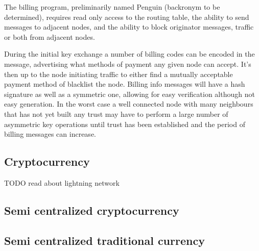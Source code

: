 \documentclass[11pt]{article}
\begin{document}
    The billing program, preliminarily named Penguin (backronym to be determined), requires read only access to the routing table, the ability to send messages to adjacent nodes, and the ability to block originator messages, traffic or both from adjacent nodes.
    
    During the initial key exchange a number of billing codes can be encoded in the message, advertising what methods of payment any given node can accept. It's then up to the node initiating traffic to either find a mutually acceptable payment method of blacklist the node. Billing info messages will have a hash signature as well as a symmetric one, allowing for easy verification although not easy generation. In the worst case a well connected node with many neighbours that has not yet built any trust may have to perform a large number of asymmetric key operations until trust has been established and the period of billing messages can increase.

    \subsection{Cryptocurrency}
    
          TODO read about lightning network
    
    \subsection{Semi centralized cryptocurrency}
    \subsection{Semi centralized traditional currency}

\medskip
\end{document}
